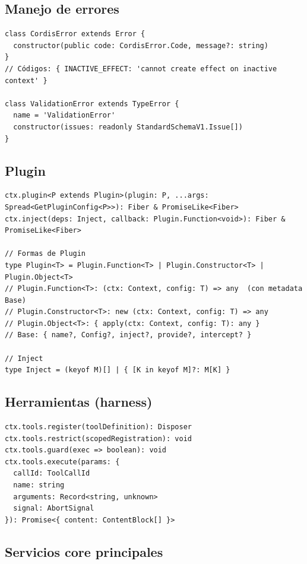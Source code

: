 \documentclass[11pt,a4paper]{article}
\begin{document}
\subsection*{Manejo de errores}


\begin{lstlisting}
class CordisError extends Error {
  constructor(public code: CordisError.Code, message?: string)
}
// Códigos: { INACTIVE_EFFECT: 'cannot create effect on inactive context' }

class ValidationError extends TypeError {
  name = 'ValidationError'
  constructor(issues: readonly StandardSchemaV1.Issue[])
}
\end{lstlisting}


\subsection*{Plugin}


\begin{lstlisting}
ctx.plugin<P extends Plugin>(plugin: P, ...args: Spread<GetPluginConfig<P>>): Fiber & PromiseLike<Fiber>
ctx.inject(deps: Inject, callback: Plugin.Function<void>): Fiber & PromiseLike<Fiber>

// Formas de Plugin
type Plugin<T> = Plugin.Function<T> | Plugin.Constructor<T> | Plugin.Object<T>
// Plugin.Function<T>: (ctx: Context, config: T) => any  (con metadata Base)
// Plugin.Constructor<T>: new (ctx: Context, config: T) => any
// Plugin.Object<T>: { apply(ctx: Context, config: T): any }
// Base: { name?, Config?, inject?, provide?, intercept? }

// Inject
type Inject = (keyof M)[] | { [K in keyof M]?: M[K] }
\end{lstlisting}


\subsection*{Herramientas (harness)}


\begin{lstlisting}
ctx.tools.register(toolDefinition): Disposer
ctx.tools.restrict(scopedRegistration): void
ctx.tools.guard(exec => boolean): void
ctx.tools.execute(params: {
  callId: ToolCallId
  name: string
  arguments: Record<string, unknown>
  signal: AbortSignal
}): Promise<{ content: ContentBlock[] }>
\end{lstlisting}


\subsection*{Servicios core principales}
\end{document}
